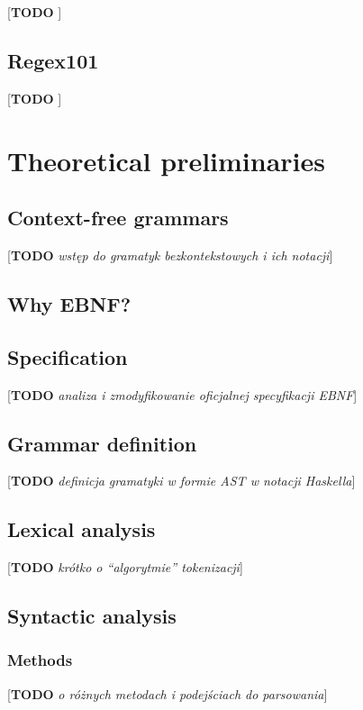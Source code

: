 \documentclass[english,engineering]{wizthesis}
\newcommand{\todo}[1]{{\color{red}[\textbf{TODO} \textit{#1}]}}
\begin{document}
\todo{\cite{ply}}

\section{Regex101}

\todo{\cite{regex101}}

\chapter{Theoretical preliminaries}

\section{Context-free grammars}

\todo{wstęp do gramatyk bezkontekstowych i ich notacji}

\section{Why EBNF?}

\section{Specification}

\todo{analiza i zmodyfikowanie oficjalnej specyfikacji EBNF}

\section{Grammar definition}

\todo{definicja gramatyki w formie AST w notacji Haskella}

\section{Lexical analysis}

\todo{krótko o ``algorytmie'' tokenizacji}

\section{Syntactic analysis}

\subsection{Methods}

\todo{o różnych metodach i podejściach do parsowania}
\end{document}
